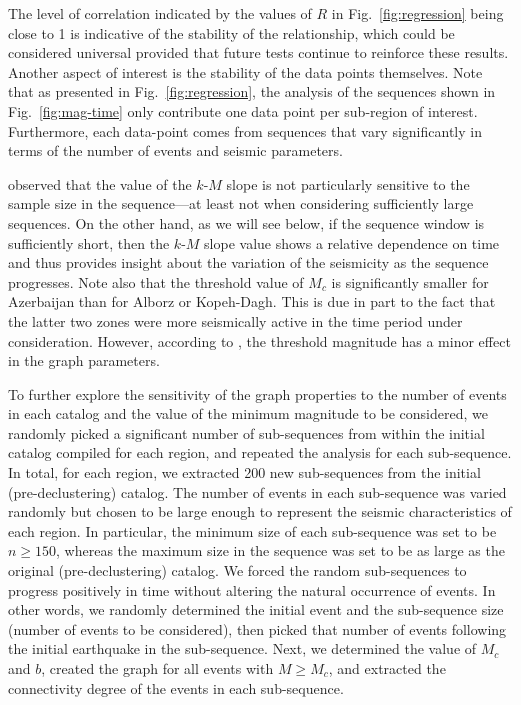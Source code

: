 The level of correlation indicated by the values of $R$ in Fig.~\ref{fig:regression} being close to 1 is indicative of the stability of the relationship, which could be considered universal provided that future tests continue to reinforce these results. Another aspect of interest is the stability of the data points themselves. Note that as presented in Fig.~\ref{fig:regression}, the analysis of the sequences shown in Fig.~\ref{fig:mag-time} only contribute one data point per sub-region of interest. Furthermore, each data-point comes from sequences that vary significantly in terms of the number of events and seismic parameters. 

\citet{Telesca2013} observed that the value of the $k$-$M$ slope is not particularly sensitive to the sample size in the sequence---at least not when considering sufficiently large sequences. On the other hand, as we will see below, if the sequence window is sufficiently short, then the $k$-$M$ slope value shows a relative dependence on time and thus provides insight about the variation of the seismicity as the sequence progresses. Note also that the threshold value of $M_c$ is significantly smaller for Azerbaijan than for Alborz or Kopeh-Dagh. This is due in part to the fact that the latter two zones were more seismically active in the time period under consideration. However, according to \citet{Telesca2012}, the threshold magnitude has a minor effect in the graph parameters.

To further explore the sensitivity of the graph properties to the number of events in each catalog and the value of the minimum magnitude to be considered, we randomly picked a significant number of sub-sequences from within the initial catalog compiled for each region, and repeated the analysis for each sub-sequence. In total, for each region, we extracted 200 new sub-sequences from the initial (pre-declustering) catalog. The number of events in each sub-sequence was varied randomly but chosen to be large enough to represent the seismic characteristics of each region. In particular, the minimum size of each sub-sequence was set to be $n \geq 150$, whereas the maximum size in the sequence was set to be as large as the original (pre-declustering) catalog. We forced the random sub-sequences to progress positively in time without altering the natural occurrence of events. In other words, we randomly determined the initial event and the sub-sequence size (number of events to be considered), then picked that number of events following the initial earthquake in the sub-sequence. Next, we determined the value of $M_c$ and $b$, created the graph for all events with $M \geq M_c$, and extracted the connectivity degree of the events in each sub-sequence. 

